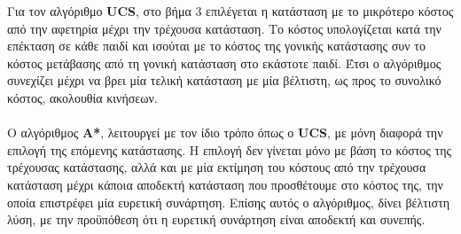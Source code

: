 \documentclass{article}
\begin{document}
        \newpage
        Για τον αλγόριθμο \textbf{UCS}, στο βήμα 3 επιλέγεται η κατάσταση με το μικρότερο κόστος από την αφετηρία μέχρι την τρέχουσα κατάσταση. Το κόστος υπολογίζεται κατά την επέκταση σε κάθε παιδί και ισούται με το κόστος της γονικής κατάστασης συν το κόστος μετάβασης από τη γονική κατάσταση στο εκάστοτε παιδί. Έτσι ο αλγόριθμος συνεχίζει μέχρι να βρει μία τελική κατάσταση με μία βέλτιστη, ως προς το συνολικό κόστος, ακολουθία κινήσεων.\\\\
        Ο αλγόριθμος \textbf{A*}, λειτουργεί με τον ίδιο τρόπο όπως ο \textbf{UCS}, με μόνη διαφορά την επιλογή της επόμενης κατάστασης. Η επιλογή δεν γίνεται μόνο με βάση το κόστος της τρέχουσας κατάστασης, αλλά και με μία εκτίμηση του κόστους από την τρέχουσα κατάσταση μέχρι κάποια αποδεκτή κατάσταση που προσθέτουμε στο κόστος της, την οποία επιστρέφει μία ευρετική συνάρτηση. Επίσης αυτός ο αλγόριθμος, δίνει βέλτιστη λύση, με την προϋπόθεση ότι η ευρετική συνάρτηση είναι αποδεκτή και συνεπής.
    
\end{document}
